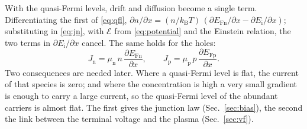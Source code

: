 \documentclass[10pt,a4paper]{scrartcl}
\newcommand{\Ef}{\mathcal{E}}                 %
\newcommand{\mun}{\mu_\mathrm{n}}
\newcommand{\mup}{\mu_\mathrm{p}}
\newcommand{\Jn}{J_\mathrm{n}}
\newcommand{\Jp}{J_\mathrm{p}}
\newcommand{\kB}{k_\mathrm{B}}
\newcommand{\EFn}{E_\mathrm{Fn}}
\newcommand{\EFp}{E_\mathrm{Fp}}
\newcommand{\dpar}[2]{\frac{\partial #1}{\partial #2}}
\begin{document}
With the quasi-Fermi levels, drift and diffusion become a single term. Differentiating the first of \eqref{eq:qfl}, $\partial n/\partial x = (n/\kB T)\,(\partial\EFn/\partial x - \partial E_\mathrm{i}/\partial x)$; substituting in \eqref{eq:jn}, with $\Ef$ from \eqref{eq:potential} and the Einstein relation, the two terms in $\partial E_\mathrm{i}/\partial x$ cancel. The same holds for the holes:
\begin{equation}
\Jn = \mun\,n\,\dpar{\EFn}{x} , \qquad \Jp = \mup\,p\,\dpar{\EFp}{x} .
\label{eq:jqfl}
\end{equation}
Two consequences are needed later. Where a quasi-Fermi level is flat, the current of that species is zero; and where the concentration is high a very small gradient is enough to carry a large current, so the quasi-Fermi level of the abundant carriers is almost flat. The first gives the junction law (Sec.~\ref{sec:bias}), the second the link between the terminal voltage and the plasma (Sec.~\ref{sec:vf}).
\end{document}
